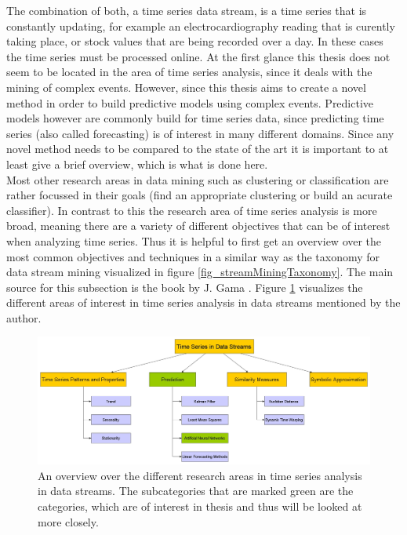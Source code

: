 The combination of both, a time series data stream, is a time series that is constantly updating, for example an electrocardiography reading that is curently taking place, or stock values that are being recorded over a day. In these cases the time series must be processed online. \newline
At the first glance this thesis does not seem to be located in the area of time series analysis, since it deals with the mining of complex events. However, since this thesis aims to create a novel method in order to build predictive models using complex events. Predictive models however are commonly build for time series data, since predicting time series (also called forecasting) is of interest in many different domains. Since any novel method needs to be compared to the state of the art it is important to at least give a brief overview, which is what is done here.\\
Most other research areas in data mining such as clustering or classification are rather focussed in their goals (find an appropriate clustering or build an acurate classifier). In contrast to this the research area of time series analysis is more broad, meaning there are a variety of different objectives that can be of interest when analyzing time series. Thus it is helpful to first get an overview over the most common objectives and techniques in a similar way as the taxonomy for data stream mining visualized in figure \ref{fig_streamMiningTaxonomy}. The main source for this subsection is the book by J. Gama \cite{gama2010knowledge}. Figure \ref{fig_timeSeriesInDataStreamsOverview} visualizes the different areas of interest in time series analysis in data streams mentioned by the author.

\begin{figure}[h]
	\centering
  	\includegraphics[width=\textwidth]{timeSeriesInDataStreamsOverview}
	\caption{An overview over the different research areas in time series analysis in data streams. The subcategories that are marked green are the categories, which are of interest in thesis and thus will be looked at more closely.}
	\label{fig_timeSeriesInDataStreamsOverview}
\end{figure}

